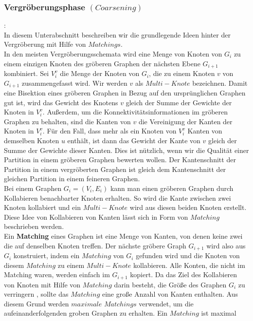 \documentclass[runningheads]{llncs}
\begin{document}
\subsubsection{Vergröberungsphase $(Coarsening)$}:\\[8pt]
In diesem Unterabschnitt beschreiben wir die grundlegende Ideen hinter der Vergröberung mit Hilfe von $Matchings$.\\
In den meisten Vergröberungsschemata wird eine Menge von Knoten von $G_i$ zu einem einzigen
Knoten des gröberen Graphen der nächsten Ebene $G_{i+1}$ kombiniert. 
Sei $V_{i}^{v}$ die Menge der Knoten von $G_i$, die zu einem Knoten $v$ von $G_{i+1}$ zusammengefasst wird. Wir werden $v$ als $Multi-Knote$ bezeichnen. Damit eine Bisektion eines gröberen Graphen in Bezug auf den ursprünglichen Graphen gut ist, wird das Gewicht des Knotens $v$ gleich der Summe der Gewichte der Knoten in $V_{i}^{v}$. Außerdem, um die Konnektivitätsinformationen im gröberen Graphen zu behalten, sind die Kanten von $v$ die Vereinigung der Kanten der Knoten in $V_{i}^{v}$. Für den Fall, dass mehr als ein Knoten von $V_{i}^{v}$ Kanten von demselben Knoten $u$ enthält, ist dann das Gewicht der Kante von $v$ gleich der Summe der Gewichte dieser Kanten. Dies ist nützlich, wenn wir die Qualität
einer Partition in einem gröberen Graphen bewerten wollen. Der Kantenschnitt der Partition in einem vergröberten Graphen
ist gleich dem Kantenschnitt der gleichen Partition in einem feineren Graphen.  \\
Bei einem Graphen $G_i = (V_i, E_i)$ kann man einen gröberen Graphen durch Kollabieren benachbarter Knoten erhalten. So wird die Kante zwischen zwei Knoten kollabiert und ein $Multi-Knote$
wird aus diesen beiden Knoten erstellt. Diese Idee von Kollabieren von Kanten lässt sich in Form von $Matching$ beschrieben werden. \\
Ein \textbf{Matching} eines Graphen ist eine Menge von Kanten, von denen keine zwei die auf denselben Knoten treffen. Der nächste gröbere Graph $G_{i+1}$ wird also aus $G_i$ konstruiert, indem ein $Matching$ von $G_i$ gefunden wird und die Knoten von diesem $Matching$ zu einem $Multi-Knote$ kollabieren. Alle Konten, die nicht im Matching waren, werden einfach im $G_{i+1}$ kopiert. Da das Ziel des Kollabieren von Knoten mit Hilfe von $Matching$ darin besteht, die Größe des Graphen $G_i$ zu verringern
, sollte das $Matching$ eine große Anzahl von Kanten enthalten. Aus diesem Grund werden $maximale$
$Matchings$ verwendet, um die aufeinanderfolgenden groben Graphen zu erhalten. Ein $Matching$ ist maximal
\end{document}
